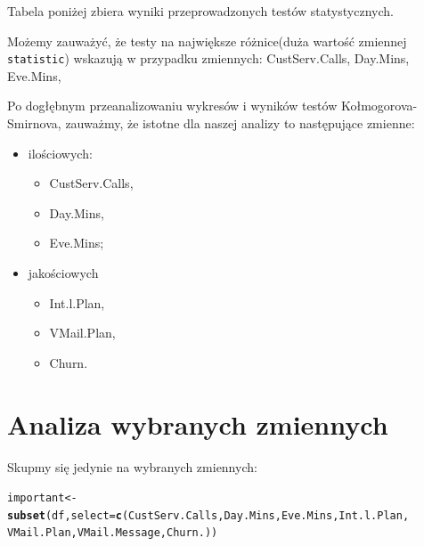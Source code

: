 \documentclass{article}\usepackage[]{graphicx}\usepackage[]{color}
\makeatletter
\newcommand{\hlstd}[1]{\textcolor[rgb]{0.345,0.345,0.345}{#1}}%
\newcommand{\hlkwb}[1]{\textcolor[rgb]{0.69,0.353,0.396}{#1}}%
\newcommand{\hlkwc}[1]{\textcolor[rgb]{0.333,0.667,0.333}{#1}}%
\newcommand{\hlkwd}[1]{\textcolor[rgb]{0.737,0.353,0.396}{\textbf{#1}}}%
\newenvironment{kframe}{%
 \def\at@end@of@kframe{}%
 \ifinner\ifhmode%
  \def\at@end@of@kframe{\end{minipage}}%
  \begin{minipage}{\columnwidth}%
 \fi\fi%
 \def\FrameCommand##1{\hskip\@totalleftmargin \hskip-\fboxsep
 \colorbox{shadecolor}{##1}\hskip-\fboxsep
     \hskip-\linewidth \hskip-\@totalleftmargin \hskip\columnwidth}%
 \MakeFramed {\advance\hsize-\width
   \@totalleftmargin\z@ \linewidth\hsize
   \@setminipage}}%
 {\par\unskip\endMakeFramed%
 \at@end@of@kframe}
\newenvironment{knitrout}{}{} %
\makeatother
\begin{document}
Tabela poniżej zbiera wyniki przeprowadzonych testów statystycznych.
\begin{table}[!h]

\caption{\label{tab:tabela_3}Wyniki testu Kolmogorova-Smirnova}
\centering
{}
\end{table}


Możemy zauważyć, że testy na największe różnice(duża wartość zmiennej \verb|statistic|) wskazują w przypadku zmiennych: CustServ.Calls, Day.Mins, Eve.Mins, 


Po dogłębnym przeanalizowaniu wykresów i wyników testów Kołmogorova-Smirnova, zauważmy, że istotne dla naszej analizy to następujące zmienne:
\begin{itemize}
  \item ilościowych:
    \begin{itemize}
    \item CustServ.Calls,
    \item Day.Mins,
    \item Eve.Mins;
    \end{itemize}
  \item jakościowych
    \begin{itemize}
    \item Int.l.Plan,
    \item VMail.Plan,
    \item Churn.
    \end{itemize}
\end{itemize}

\section{Analiza wybranych zmiennych}
Skupmy się jedynie na wybranych zmiennych:
\begin{knitrout}
\color{fgcolor}\begin{kframe}
\begin{alltt}
\hlstd{important} \hlkwb{<-} \hlkwd{subset}\hlstd{(df,} \hlkwc{select}\hlstd{=}\hlkwd{c}\hlstd{(CustServ.Calls, Day.Mins, Eve.Mins, Int.l.Plan,}
                                 \hlstd{VMail.Plan, VMail.Message, Churn.))}
\end{alltt}
\end{kframe}
\end{knitrout}
\end{document}
